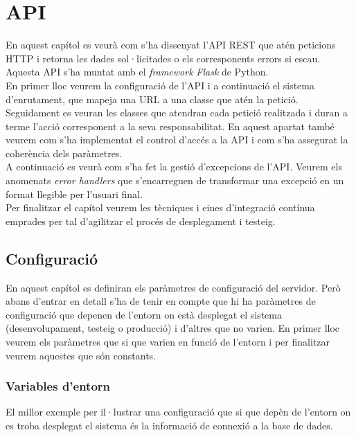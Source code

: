 \section{\ac{API}} \label{sec_api2}

En aquest capítol es veurà com s'ha dissenyat l'\ac{API} \ac{REST} que atén peticions \ac{HTTP} i retorna les dades sol·licitades o els corresponents errors si escau. Aquesta \ac{API} s'ha muntat amb el \emph{framework} \emph{Flask} de Python. \\

En primer lloc veurem la configuració de l'\ac{API} i a continuació el sistema d'enrutament, que mapeja una \ac{URL} a una classe que atén la petició.\\

Seguidament es veuran les classes que atendran cada petició realitzada i duran a terme l'acció corresponent a la seva responsabilitat. En aquest apartat també veurem com s'ha implementat el control d'accés a la \ac{API} i com s'ha assegurat la coherència dels paràmetres.\\

A continuació es veurà com s'ha fet la gestió d'excepcions de l'\ac{API}. Veurem els anomenats \emph{error handlers} que s'encarreguen de transformar una excepció en un format llegible per l'usuari final.\\

Per finalitzar el capítol veurem les tècniques i eines d'integració contínua emprades per tal d'agilitzar el procés de desplegament i testeig.

\subsection{Configuració}

En aquest capítol es definiran els paràmetres de configuració del servidor. Però abans d'entrar en detall s'ha de tenir en compte que hi ha paràmetres de configuració que depenen de l'entorn on està desplegat el sistema (desenvolupament, testeig o producció) i d'altres que no varien. En primer lloc veurem els paràmetres que si que varien en funció de l'entorn i per finalitzar veurem aquestes que són constants.

\subsubsection{Variables d'entorn} \label{configuracion_entorn}

El millor exemple per il·lustrar una configuració que si que depèn de l'entorn on es troba desplegat el sistema és la informació de connexió a la base de dades.\\

